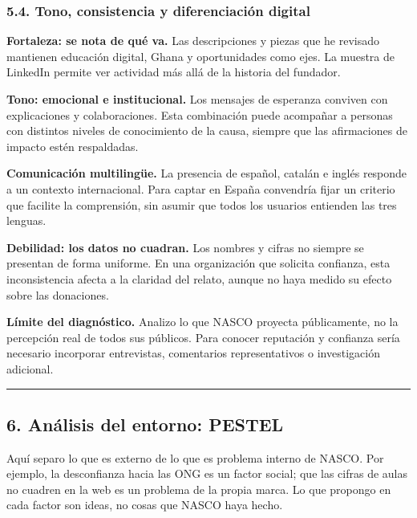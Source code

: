 \documentclass[
]{article}
\begin{document}
\hypertarget{tono-consistencia-y-diferenciaciuxf3n-digital}{%
\subsubsection{5.4. Tono, consistencia y diferenciación
digital}\label{tono-consistencia-y-diferenciaciuxf3n-digital}}

\textbf{Fortaleza: se nota de qué va.} Las descripciones y piezas que he
revisado mantienen educación digital, Ghana y oportunidades como ejes.
La muestra de LinkedIn permite ver actividad más allá de la historia del
fundador.

\textbf{Tono: emocional e institucional.} Los mensajes de esperanza
conviven con explicaciones y colaboraciones. Esta combinación puede
acompañar a personas con distintos niveles de conocimiento de la causa,
siempre que las afirmaciones de impacto estén respaldadas.

\textbf{Comunicación multilingüe.} La presencia de español, catalán e
inglés responde a un contexto internacional. Para captar en España
convendría fijar un criterio que facilite la comprensión, sin asumir que
todos los usuarios entienden las tres lenguas.

\textbf{Debilidad: los datos no cuadran.} Los nombres y cifras no
siempre se presentan de forma uniforme. En una organización que solicita
confianza, esta inconsistencia afecta a la claridad del relato, aunque
no haya medido su efecto sobre las donaciones.

\textbf{Límite del diagnóstico.} Analizo lo que NASCO proyecta
públicamente, no la percepción real de todos sus públicos. Para conocer
reputación y confianza sería necesario incorporar entrevistas,
comentarios representativos o investigación adicional.

\begin{center}\rule{0.5\linewidth}{0.5pt}\end{center}

\hypertarget{anuxe1lisis-del-entorno-pestel}{%
\subsection{6. Análisis del entorno:
PESTEL}\label{anuxe1lisis-del-entorno-pestel}}

Aquí separo lo que es externo de lo que es problema interno de NASCO.
Por ejemplo, la desconfianza hacia las ONG es un factor social; que las
cifras de aulas no cuadren en la web es un problema de la propia marca.
Lo que propongo en cada factor son ideas, no cosas que NASCO haya hecho.
\end{document}
